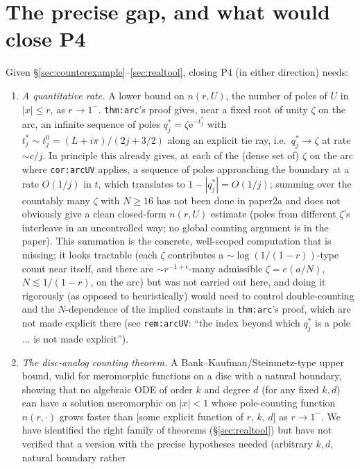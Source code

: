\documentclass[11pt]{article}
\theoremstyle{remark}
\newcommand{\e}{\mathrm e}
\begin{document}
\section{The precise gap, and what would close P4}\label{sec:gap}

Given \S\ref{sec:counterexample}--\ref{sec:realtool}, closing P4 (in either direction) needs:

\begin{enumerate}
\item[(a)] \emph{A quantitative rate.} A lower bound on $n(r,U)$, the number of poles of $U$ in
$|x|\le r$, as $r\to1^-$. \texttt{thm:arc}'s proof gives, near a fixed root of unity $\zeta$ on the
arc, an infinite sequence of poles $q^\ast_j=\zeta\e^{-t^\ast_j}$ with $t^\ast_j\sim t^0_j=(L+i\pi
)/(2j+3/2)$ along an explicit tie ray, i.e.\ $q^\ast_j\to\zeta$ at rate $\sim c/j$. In principle this
already gives, at each of the (dense set of) $\zeta$ on the arc where \texttt{cor:arcUV} applies, a
sequence of poles approaching the boundary at a rate $O(1/j)$ in $t$, which translates to
$1-|q^\ast_j|=O(1/j)$; summing over the countably many $\zeta$ with $N\ge16$ has not been done in
paper2a and does not obviously give a clean closed-form $n(r,U)$ estimate (poles from different
$\zeta$'s interleave in an uncontrolled way; no global counting argument is in the paper). This
summation is the concrete, well-scoped computation that is missing; it looks tractable (each $\zeta$
contributes a $\sim\log(1/(1-r))$-type count near itself, and there are $\sim r^{-1+\epsilon}$-many
admissible $\zeta=e(a/N)$, $N\lesssim1/(1-r)$, on the arc) but was not carried out here, and doing it
rigorously (as opposed to heuristically) would need to control double-counting and the
$N$-dependence of the implied constants in \texttt{thm:arc}'s proof, which are not made explicit
there (see \texttt{rem:arcUV}: ``the index beyond which $q^\ast_j$ is a pole $\ldots$ is not made
explicit'').
\item[(b)] \emph{The disc-analog counting theorem.} A Bank--Kaufman/Steinmetz-type upper bound, valid
for meromorphic functions on a disc with a natural boundary, showing that no algebraic ODE of order
$k$ and degree $d$ (for any fixed $k,d$) can have a solution meromorphic on $|x|<1$ whose
pole-counting function $n(r,\cdot)$ grows faster than [some explicit function of $r$, $k$, $d$] as
$r\to1^-$. We have identified the right family of theorems (\S\ref{sec:realtool}) but have not
verified that a version with the precise hypotheses needed (arbitrary $k,d$, natural boundary rather

\end{enumerate}
\end{document}
